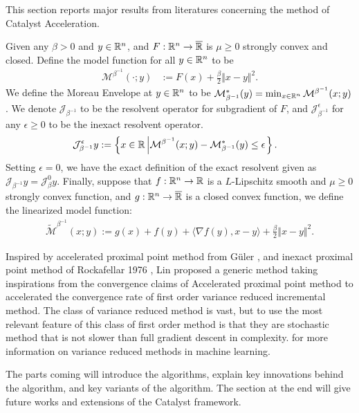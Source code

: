 \documentclass[12pt]{article}
\begin{document}
    This section reports major results from literatures concerning the method of Catalyst Acceleration. 
    \begin{assumption}
        Given any $\beta > 0$ and $y \in \mathbb R^n$, and $F: \mathbb R^n\rightarrow \overline {\mathbb R}$ is $\mu \ge 0$ strongly convex and closed. 
        Define the model function for all $y\in \mathbb R^n$ to be 
        \begin{align*}
            \mathcal M^{\beta^{-1}}(\cdot; y) &:= 
            F(x) + \frac{\beta}{2}\Vert x - y\Vert^2.
        \end{align*}
        We define the Moreau Envelope at $y \in \mathbb R^n$ to be $\mathcal M^*_{\beta^{-1}}(y) = \min_{x\in \mathbb R^n} \mathcal M^{\beta^{-1}}(x; y)$. 
        We denote $\mathcal J_{\beta^{-1}}$ to be the resolvent operator for subgradient of $F$, and $\mathcal J_{\beta^{-1}}^\epsilon$ for any $\epsilon \ge 0$ to be the inexact resolvent operator. 
        \begin{align*}
            \mathcal J_{\beta^{-1}}^\epsilon y &:= 
            \left\lbrace
                x \in \mathbb R \left | 
                    \mathcal M^{\beta^{-1}}(x; y) - 
                    \mathcal M_{\beta^{-1}}^*(y) \le \epsilon
                \right.
            \right\rbrace. 
        \end{align*}
        Setting $\epsilon = 0$, we have the exact definition of the exact resolvent given as $\mathcal J_{\beta^{-1}}y = \mathcal J^0_{\beta}y$. 
        Finally, suppose that $f: \mathbb R^n \rightarrow \mathbb R$ is a $L$-Lipschitz smooth and $\mu \ge 0$ strongly convex function, and $g: \mathbb R^n \rightarrow \overline {\mathbb R}$ is a closed convex function, we define the linearized model function: 
        \begin{align*}
            \widetilde{\mathcal M}^{\beta^{-1}}(x; y) := 
            g(x) + f(y) + \langle \nabla f(y), x - y\rangle + \frac{\beta}{2}\Vert x - y\Vert^2. 
        \end{align*}
    \end{assumption}

    Inspired by accelerated proximal point method from Güler \cite{guler_new_1992}, and inexact proximal point method of Rockafellar 1976 \cite{rockafellar_monotone_1976}, Lin \cite{lin_universal_2015} proposed a generic method taking inspirations from the convergence claims of Accelerated proximal point method to accelerated the convergence rate of first order variance reduced incremental method. 
    The class of variance reduced method is vast, but to use the most relevant feature of this class of first order method is that they are stochastic method that is not slower than full gradient descent in complexity. 
     for more information on variance reduced methods in machine learning. 
    \par
    The parts coming will introduce the algorithms, explain key innovations behind the algorithm, and key variants of the algorithm. 
    The section at the end will give future works and extensions of the Catalyst framework. 
\end{document}

